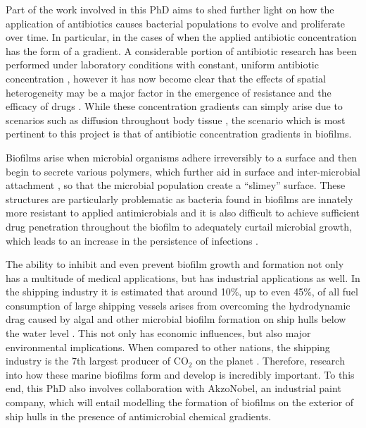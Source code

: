 \documentclass[a4paper,12pt]{article}
\begin{document}
Part of the work involved in this PhD aims to shed further light on how the application of antibiotics causes bacterial populations
to evolve and proliferate over time.  In particular, in the cases of when the applied antibiotic concentration has
the form of a gradient.  A considerable portion of antibiotic research has been performed under laboratory conditions
with constant, uniform antibiotic concentration \cite{bioref:Grasso-constant-antibtioic-concn}, however it has now become clear that the 
effects of spatial heterogeneity may be a major factor in the emergence of resistance 
and the efficacy of drugs \cite{bioref:Zhang-effects-of-antibio-grad}.  While these concentration gradients can simply arise 
due to scenarios such as diffusion throughout body tissue \cite{bioref:tissue-antibio-grads}, the scenario which is most pertinent
to this project is that of antibiotic concentration gradients in biofilms.

Biofilms arise when microbial organisms adhere irreversibly to a surface and then begin to secrete various polymers, which further aid
in surface and inter-microbial attachment \cite{bioref:biofilm-formation}, so that the microbial population create a ``slimey'' surface.  These structures are 
particularly problematic as bacteria found in biofilms are innately more resistant to applied antimicrobials and  it is also difficult to achieve sufficient drug 
penetration throughout the biofilm to adequately curtail microbial growth, which leads to an increase in the persistence of infections \cite{biofilms:Costerton-biofilms-persistent}.

The ability to inhibit and even prevent biofilm growth and formation not only has a multitude of medical applications, but has industrial applications as well.
In the shipping industry it is estimated that around 10\%, up to even 45\%, of all fuel consumption of large shipping vessels arises from overcoming the 
hydrodynamic drag caused by algal and other microbial biofilm formation on ship hulls below the water level \cite{bioref:biofilm-fuel-consumption}.  This not only has
economic influences, but also major environmental implications.  When compared to other nations, the shipping industry is the 7th largest 
producer of CO$_2$ on the planet \cite{bioref:shipping-CO2-nation}.  Therefore, research into how these marine biofilms form and develop is 
incredibly important.  To this end, this PhD also involves collaboration with AkzoNobel, an industrial paint company, which will entail modelling the formation of biofilms 
on the exterior of ship hulls in the presence of antimicrobial chemical gradients.
\end{document}
